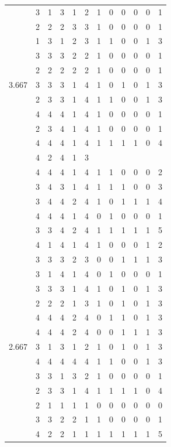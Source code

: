 \documentclass[]{book}
\theoremstyle{definition}
\theoremstyle{definition}
\theoremstyle{definition}
\theoremstyle{remark}
\begin{document}
\begin{table}
{\begin{tabular}[t]{rrrrrrrrrrrr}
 & 3 & 1 & 3 & 1 & 2 & 1 & 0 & 0 & 0 & 0 & 1\\
 & 2 & 2 & 2 & 3 & 3 & 1 & 0 & 0 & 0 & 0 & 1\\
 & 1 & 3 & 1 & 2 & 3 & 1 & 1 & 0 & 0 & 1 & 3\\
 & 3 & 3 & 3 & 2 & 2 & 1 & 0 & 0 & 0 & 0 & 1\\
 & 2 & 2 & 2 & 2 & 2 & 1 & 0 & 0 & 0 & 0 & 1\\
3.667 & 3 & 3 & 3 & 1 & 4 & 1 & 0 & 1 & 0 & 1 & 3\\
 & 2 & 3 & 3 & 1 & 4 & 1 & 1 & 0 & 0 & 1 & 3\\
 & 4 & 4 & 4 & 1 & 4 & 1 & 0 & 0 & 0 & 0 & 1\\
 & 2 & 3 & 4 & 1 & 4 & 1 & 0 & 0 & 0 & 0 & 1\\
 & 4 & 4 & 4 & 1 & 4 & 1 & 1 & 1 & 1 & 0 & 4\\
 & 4 & 2 & 4 & 1 & 3 &  &  &  &  &  & \\
 & 4 & 4 & 4 & 1 & 4 & 1 & 1 & 0 & 0 & 0 & 2\\
 & 3 & 4 & 3 & 1 & 4 & 1 & 1 & 1 & 0 & 0 & 3\\
 & 3 & 4 & 4 & 2 & 4 & 1 & 0 & 1 & 1 & 1 & 4\\
 & 4 & 4 & 4 & 1 & 4 & 0 & 1 & 0 & 0 & 0 & 1\\
 & 3 & 3 & 4 & 2 & 4 & 1 & 1 & 1 & 1 & 1 & 5\\
 & 4 & 1 & 4 & 1 & 4 & 1 & 0 & 0 & 0 & 1 & 2\\
 & 3 & 3 & 3 & 2 & 3 & 0 & 0 & 1 & 1 & 1 & 3\\
 & 3 & 1 & 4 & 1 & 4 & 0 & 1 & 0 & 0 & 0 & 1\\
 & 3 & 3 & 3 & 1 & 4 & 1 & 0 & 1 & 0 & 1 & 3\\
 & 2 & 2 & 2 & 1 & 3 & 1 & 0 & 1 & 0 & 1 & 3\\
 & 4 & 4 & 4 & 2 & 4 & 0 & 1 & 1 & 0 & 1 & 3\\
 & 4 & 4 & 4 & 2 & 4 & 0 & 0 & 1 & 1 & 1 & 3\\
2.667 & 3 & 1 & 3 & 1 & 2 & 1 & 0 & 1 & 0 & 1 & 3\\
 & 4 & 4 & 4 & 4 & 4 & 1 & 1 & 0 & 0 & 1 & 3\\
 & 3 & 3 & 1 & 3 & 2 & 1 & 0 & 0 & 0 & 0 & 1\\
 & 2 & 3 & 3 & 1 & 4 & 1 & 1 & 1 & 1 & 0 & 4\\
 & 2 & 1 & 1 & 1 & 1 & 0 & 0 & 0 & 0 & 0 & 0\\
 & 3 & 3 & 2 & 2 & 1 & 1 & 0 & 0 & 0 & 0 & 1\\
 & 4 & 2 & 2 & 1 & 1 & 1 & 1 & 1 & 1 & 1 & 5\\

\end{tabular}}
\end{table}
\end{document}
